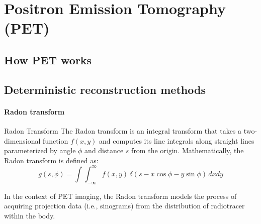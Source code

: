 \section{Positron Emission Tomography (PET)}

\subsection{How PET works}

\subsection{Deterministic reconstruction methods}

\paragraph{Radon transform}

\begin{definition}{Radon Transform}
\label{def:radon_transform}
    The Radon transform is an integral transform that takes a two-dimensional function $f(x,y)$ and computes its line integrals along straight lines parameterized by angle $\phi$ and distance $s$ from the origin.
    Mathematically, the Radon transform is defined as:
    \begin{equation}
        g(s, \phi) = \int \int_{-\infty}^{\infty} f(x,y) \, \delta(s - x \cos \phi - y \sin \phi) \, dx dy
    \end{equation}
\end{definition}

In the context of PET imaging, the Radon transform models the process of acquiring projection data (i.e., sinograms) from the distribution of radiotracer within the body.

